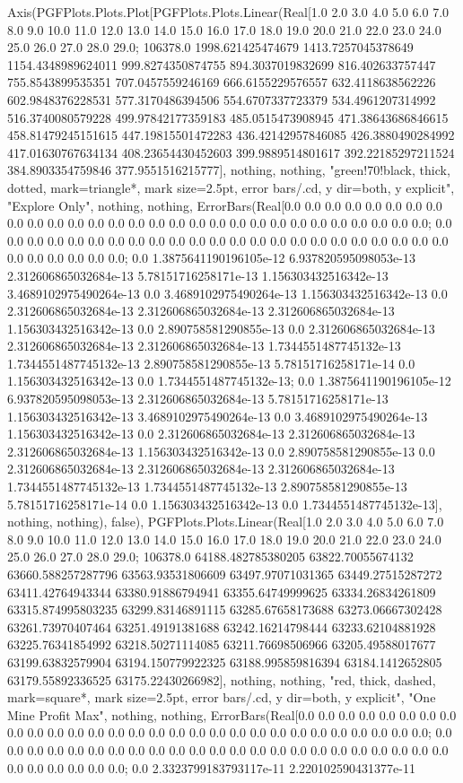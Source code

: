 \documentclass[tikz]{standalone}
\begin{document}
Axis(PGFPlots.Plots.Plot[PGFPlots.Plots.Linear(Real[1.0 2.0 3.0 4.0 5.0 6.0 7.0 8.0 9.0 10.0 11.0 12.0 13.0 14.0 15.0 16.0 17.0 18.0 19.0 20.0 21.0 22.0 23.0 24.0 25.0 26.0 27.0 28.0 29.0; 106378.0 1998.621425474679 1413.7257045378649 1154.4348989624011 999.8274350874755 894.3037019832699 816.402633757447 755.8543899535351 707.0457559246169 666.6155229576557 632.4118638562226 602.9848376228531 577.3170486394506 554.6707337723379 534.4961207314992 516.3740080579228 499.97842177359183 485.0515473908945 471.38643686846615 458.81479245151615 447.19815501472283 436.42142957846085 426.3880490284992 417.01630767634134 408.23654430452603 399.9889514801617 392.22185297211524 384.8903354759846 377.9551516215777], nothing, nothing, "green!70!black, thick, dotted, mark=triangle*, mark size=2.5pt, error bars/.cd, y dir=both, y explicit", "Explore Only", nothing, nothing, ErrorBars(Real[0.0 0.0 0.0 0.0 0.0 0.0 0.0 0.0 0.0 0.0 0.0 0.0 0.0 0.0 0.0 0.0 0.0 0.0 0.0 0.0 0.0 0.0 0.0 0.0 0.0 0.0 0.0 0.0 0.0; 0.0 0.0 0.0 0.0 0.0 0.0 0.0 0.0 0.0 0.0 0.0 0.0 0.0 0.0 0.0 0.0 0.0 0.0 0.0 0.0 0.0 0.0 0.0 0.0 0.0 0.0 0.0 0.0 0.0; 0.0 1.3875641190196105e-12 6.937820595098053e-13 2.312606865032684e-13 5.78151716258171e-13 1.156303432516342e-13 3.4689102975490264e-13 0.0 3.4689102975490264e-13 1.156303432516342e-13 0.0 2.312606865032684e-13 2.312606865032684e-13 2.312606865032684e-13 1.156303432516342e-13 0.0 2.890758581290855e-13 0.0 2.312606865032684e-13 2.312606865032684e-13 2.312606865032684e-13 1.7344551487745132e-13 1.7344551487745132e-13 2.890758581290855e-13 5.78151716258171e-14 0.0 1.156303432516342e-13 0.0 1.7344551487745132e-13; 0.0 1.3875641190196105e-12 6.937820595098053e-13 2.312606865032684e-13 5.78151716258171e-13 1.156303432516342e-13 3.4689102975490264e-13 0.0 3.4689102975490264e-13 1.156303432516342e-13 0.0 2.312606865032684e-13 2.312606865032684e-13 2.312606865032684e-13 1.156303432516342e-13 0.0 2.890758581290855e-13 0.0 2.312606865032684e-13 2.312606865032684e-13 2.312606865032684e-13 1.7344551487745132e-13 1.7344551487745132e-13 2.890758581290855e-13 5.78151716258171e-14 0.0 1.156303432516342e-13 0.0 1.7344551487745132e-13], nothing, nothing), false), PGFPlots.Plots.Linear(Real[1.0 2.0 3.0 4.0 5.0 6.0 7.0 8.0 9.0 10.0 11.0 12.0 13.0 14.0 15.0 16.0 17.0 18.0 19.0 20.0 21.0 22.0 23.0 24.0 25.0 26.0 27.0 28.0 29.0; 106378.0 64188.482785380205 63822.70055674132 63660.588257287796 63563.93531806609 63497.97071031365 63449.27515287272 63411.42764943344 63380.91886794941 63355.64749999625 63334.26834261809 63315.874995803235 63299.83146891115 63285.67658173688 63273.06667302428 63261.73970407464 63251.49191381688 63242.16214798444 63233.62104881928 63225.76341854992 63218.50271114085 63211.76698506966 63205.49588017677 63199.63832579904 63194.150779922325 63188.995859816394 63184.1412652805 63179.55892336525 63175.22430266982], nothing, nothing, "red, thick, dashed, mark=square*, mark size=2.5pt, error bars/.cd, y dir=both, y explicit", "One Mine Profit Max", nothing, nothing, ErrorBars(Real[0.0 0.0 0.0 0.0 0.0 0.0 0.0 0.0 0.0 0.0 0.0 0.0 0.0 0.0 0.0 0.0 0.0 0.0 0.0 0.0 0.0 0.0 0.0 0.0 0.0 0.0 0.0 0.0 0.0; 0.0 0.0 0.0 0.0 0.0 0.0 0.0 0.0 0.0 0.0 0.0 0.0 0.0 0.0 0.0 0.0 0.0 0.0 0.0 0.0 0.0 0.0 0.0 0.0 0.0 0.0 0.0 0.0 0.0; 0.0 2.3323799183793117e-11 2.220102590431377e-11 
\end{document}
